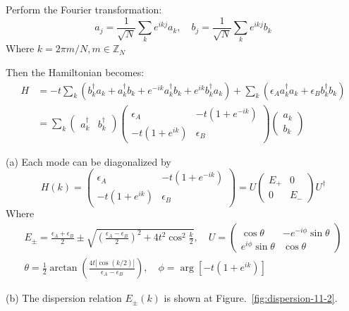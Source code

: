 \documentclass[a4paper,11pt]{article}
\begin{document}
Perform the Fourier transformation:
\begin{equation}
    a_j=\frac{1}{\sqrt{N}}\sum_{k}e^{ikj}a_k,\quad 
    b_j=\frac{1}{\sqrt{N}}\sum_{k}e^{ikj}b_k
\end{equation}
Where $k=2\pi m/N, m\in\mathbb Z_N$

Then the Hamiltonian becomes:
\begin{align}
    H
    &=-t\sum_{k}(b_k^\dagger a_k + a_k^\dagger b_k+e^{-ik}a_k^\dagger b_k + e^{ik}b_k^\dagger a_k)+\sum_k (\epsilon_A a_k^\dagger a_k + \epsilon_B b_k^\dagger b_k) \\
    &=\sum_k
    \begin{pmatrix}
        a_k^\dagger & b_k^\dagger
    \end{pmatrix}
    \begin{pmatrix}
        \epsilon_A & -t(1+e^{-ik}) \\
        -t(1+e^{ik}) & \epsilon_B
    \end{pmatrix}
    \begin{pmatrix}
        a_k \\ b_k
    \end{pmatrix}
\end{align}

(a) Each mode can be diagonalized by
\begin{equation}
    H(k)=\begin{pmatrix}
        \epsilon_A & -t(1+e^{-ik}) \\
        -t(1+e^{ik}) & \epsilon_B
    \end{pmatrix}
    =U\begin{pmatrix}
        E_+ & 0\\
        0 & E_-
    \end{pmatrix}U^\dagger
\end{equation}
Where 
\begin{gather}
    E_\pm=\frac{\epsilon_A + \epsilon_B}{2}\pm\sqrt{\left(\frac{\epsilon_A-\epsilon_B}{2}\right)^2 + 4t^2\cos^2\frac{k}{2}}, \quad U=\begin{pmatrix}
        \cos\theta & -e^{-i\phi}\sin\theta \\
        e^{i\phi}\sin\theta & \cos\theta
    \end{pmatrix} \\
    \theta = \frac{1}{2}\arctan\left(\frac{4t|\cos(k/2)|}{\epsilon_A-\epsilon_B}\right), \quad \phi = \arg\left[-t(1+e^{ik})\right]
\end{gather}


(b) The dispersion relation $E_\pm(k)$ is shown at Figure.~\ref{fig:dispersion-11-2}.
\end{document}
